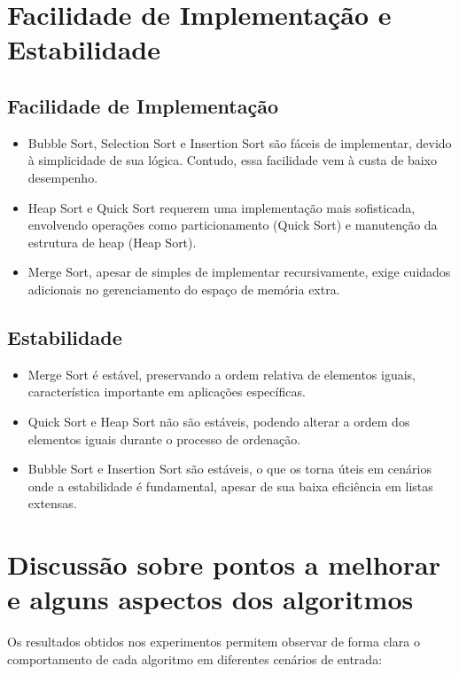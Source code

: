 \documentclass[12pt, a4paper]{report}
\begin{document}
\section{Facilidade de Implementação e Estabilidade}

\subsection{Facilidade de Implementação}
\begin{itemize}
    \item Bubble Sort, Selection Sort e Insertion Sort são fáceis de implementar, devido à simplicidade de sua lógica. Contudo, essa facilidade vem à custa de baixo desempenho.
    \item Heap Sort e Quick Sort requerem uma implementação mais sofisticada, envolvendo operações como particionamento (Quick Sort) e manutenção da estrutura de heap (Heap Sort).
    \item Merge Sort, apesar de simples de implementar recursivamente, exige cuidados adicionais no gerenciamento do espaço de memória extra.
\end{itemize}

\subsection{Estabilidade}
\begin{itemize}
    \item Merge Sort é estável, preservando a ordem relativa de elementos iguais, característica importante em aplicações específicas.
    \item Quick Sort e Heap Sort não são estáveis, podendo alterar a ordem dos elementos iguais durante o processo de ordenação.
    \item Bubble Sort e Insertion Sort são estáveis, o que os torna úteis em cenários onde a estabilidade é fundamental, apesar de sua baixa eficiência em listas extensas.
\end{itemize}


\section{Discussão sobre pontos a melhorar e alguns aspectos dos algoritmos}

Os resultados obtidos nos experimentos permitem observar de forma clara o comportamento de cada algoritmo em diferentes cenários de entrada:
\end{document}
